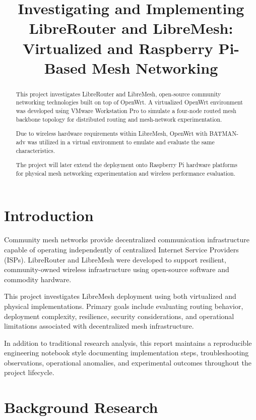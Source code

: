 \documentclass[conference]{IEEEtran}
\title{
Investigating and Implementing LibreRouter and LibreMesh:
Virtualized and Raspberry Pi-Based Mesh Networking
}
\author{
\IEEEauthorblockN{\small
Bastas, Dimitrios (LT),
Kamilos, Dimitrios (LT)\\
Rachel Goldstein (LT),
Robert Leyba (LT)\\
Margaret Moore (LTJG)
}
\IEEEauthorblockA{
EC3730 Final Project
}
}
\begin{document}
\maketitle

\begin{abstract}

This project investigates LibreRouter and LibreMesh, open-source community networking technologies built on top of OpenWrt. A virtualized OpenWrt environment was developed using VMware Workstation Pro to simulate a four-node routed mesh backbone topology for distributed routing and mesh-network experimentation.

Due to wireless hardware requirements within LibreMesh, OpenWrt with BATMAN-adv was utilized in a virtual environment to emulate and evaluate the same characteristics. 

The project will later extend the deployment onto Raspberry Pi hardware platforms for physical mesh networking experimentation and wireless performance evaluation.

\end{abstract}

\section{Introduction}

Community mesh networks provide decentralized communication infrastructure capable of operating independently of centralized Internet Service Providers (ISPs). LibreRouter and LibreMesh were developed to support resilient, community-owned wireless infrastructure using open-source software and commodity hardware.

This project investigates LibreMesh deployment using both virtualized and physical implementations. Primary goals include evaluating routing behavior, deployment complexity, resilience, security considerations, and operational limitations associated with decentralized mesh infrastructure.

In addition to traditional research analysis, this report maintains a reproducible engineering notebook style documenting implementation steps, troubleshooting observations, operational anomalies, and experimental outcomes throughout the project lifecycle.

\section{Background Research}
\end{document}
